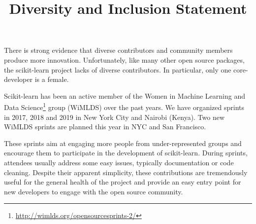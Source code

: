 \documentclass{article}
\title{Diversity and Inclusion Statement}
\begin{document}
 
    \maketitle
 

There is strong evidence that diverse contributors and community members produce more innovation. Unfortunately, like many other open source packages, the scikit-learn project lacks of diverse contributors. In particular, only one core-developer is a female.

Scikit-learn has been an active member of the Women in Machine Learning and Data Science\footnote{\href{http://wimlds.org/opensourcesprints-2/}{http://wimlds.org/opensourcesprints-2/}} group (WiMLDS) over the past years. We have organized sprints in 2017, 2018 and 2019 in New York City and Nairobi (Kenya). Two new WiMLDS sprints are planned this year in NYC and San Francisco. 

These sprints aim at engaging more people from under-represented groups and
encourage them to participate in the development of scikit-learn. During sprints, attendees usually address some easy issues, typically
documentation or code cleaning. Despite their apparent simplicity, these
contributions are tremendously useful for the general health of the project
and provide an easy entry point for new developers to engage with the open
source community.
\end{document}

